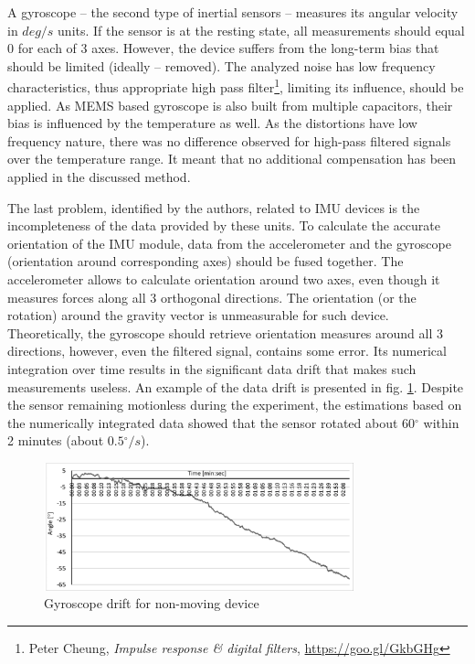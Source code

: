 \documentclass[sensors,article,submit,moreauthors,pdftex,10pt,a4paper]{mdpi}
\newcommand{\degree}{\ensuremath{{}^{\circ}}\xspace}
\begin{document}
A gyroscope – the second type of inertial sensors – measures its angular velocity in $deg/s$  units. If the sensor is at the resting state, all measurements should equal 0 for each of 3 axes. However, the device suffers from the long-term bias that should be limited (ideally – removed). The analyzed noise has low frequency characteristics, thus appropriate high pass filter\footnote{Peter Cheung, \textit{Impulse response \& digital filters}, \url{https://goo.gl/GkbGHg}}, limiting its influence, should be applied. As MEMS based gyroscope is also built from multiple capacitors, their bias is influenced by the temperature as well. As the distortions have low frequency nature, there was no difference observed for high-pass filtered signals over the temperature range. It meant that no additional compensation has been applied in the discussed method. 

The last problem, identified by the authors, related to IMU devices is the incompleteness of the data provided by these units. To calculate the accurate orientation of the IMU module, data from the accelerometer and the gyroscope (orientation around corresponding axes) should be fused together. The accelerometer allows to calculate orientation around two axes, even though it measures forces along all 3 orthogonal directions. The orientation (or the rotation) around the gravity vector is unmeasurable for such device. Theoretically, the gyroscope should retrieve orientation measures around all 3 directions, however, even the filtered signal, contains some error. Its numerical integration over time results in the significant data drift that makes such measurements useless. An example of the data drift is presented in fig. \ref{fig:imu:drift}. Despite the sensor remaining motionless during the experiment, the estimations based on the numerically integrated data showed that the sensor rotated about $60\degree$ within 2 minutes (about $0.5\degree/s$).
\begin{figure}[H]
	\centering
	\includegraphics[width=0.8\textwidth]{Figure7.png}
	\caption{Gyroscope drift for non-moving device}
	\label{fig:imu:drift}
\end{figure}
\end{document}
